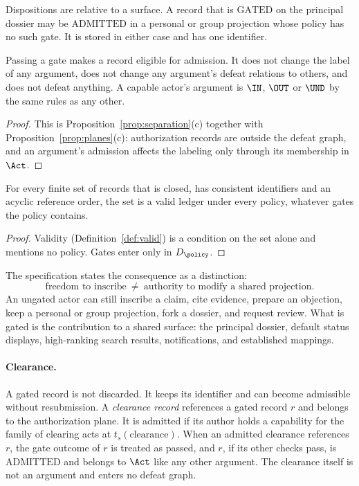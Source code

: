 Dispositions are relative to a surface. A record that is $\mathrm{GATED}$ on the principal dossier may be $\mathrm{ADMITTED}$ in a personal or group projection whose policy has no such gate. It is stored in either case and has one identifier.

\begin{proposition}\label{prop:capnostanding}
Passing a gate makes a record eligible for admission. It does not change the label of any argument, does not change any argument's defeat relations to others, and does not defeat anything. A capable actor's argument is $\IN$, $\OUT$ or $\UND$ by the same rules as any other.
\end{proposition}

\begin{proof}
This is Proposition~\ref{prop:separation}(c) together with Proposition~\ref{prop:planes}(c): authorization records are outside the defeat graph, and an argument's admission affects the labeling only through its membership in $\Act$.
\end{proof}

\begin{proposition}\label{prop:openinscription}
For every finite set of records that is closed, has consistent identifiers and an acyclic reference order, the set is a valid ledger under every policy, whatever gates the policy contains.
\end{proposition}

\begin{proof}
Validity (Definition~\ref{def:valid}) is a condition on the set alone and mentions no policy. Gates enter only in $D_\policy$.
\end{proof}

The specification states the consequence as a distinction:
\[
\text{freedom to inscribe}\ \ne\ \text{authority to modify a shared projection}.
\]
An ungated actor can still inscribe a claim, cite evidence, prepare an objection, keep a personal or group projection, fork a dossier, and request review. What is gated is the contribution to a shared surface: the principal dossier, default status displays, high-ranking search results, notifications, and established mappings.

\paragraph{Clearance.} A gated record is not discarded. It keeps its identifier and can become admissible without resubmission. A \emph{clearance record} references a gated record $r$ and belongs to the authorization plane. It is admitted if its author holds a capability for the family of clearing acts at $t_s(\text{clearance})$. When an admitted clearance references $r$, the gate outcome of $r$ is treated as passed, and $r$, if its other checks pass, is $\mathrm{ADMITTED}$ and belongs to $\Act$ like any other argument. The clearance itself is not an argument and enters no defeat graph.

